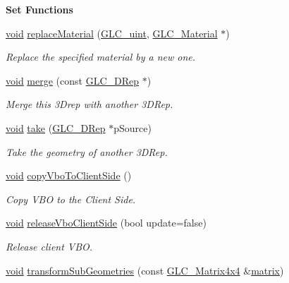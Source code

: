 \begin{Indent}{\bf Set Functions}
\begin{DoxyCompactItemize}
\hyperlink{group___u_a_v_objects_plugin_ga444cf2ff3f0ecbe028adce838d373f5c}{void} \hyperlink{class_g_l_c__3_d_rep_a1aa803da235b8c63f543c22ea040668e}{replace\-Material} (\hyperlink{glc__global_8h_abf950976fabed69026558df8e2da6c6b}{G\-L\-C\-\_\-uint}, \hyperlink{class_g_l_c___material}{G\-L\-C\-\_\-\-Material} $\ast$)
\begin{DoxyCompactList}\small\item\em Replace the specified material by a new one. \end{DoxyCompactList}\item 
\hyperlink{group___u_a_v_objects_plugin_ga444cf2ff3f0ecbe028adce838d373f5c}{void} \hyperlink{class_g_l_c__3_d_rep_a2a258fd51a958d88ed1bf466810d1aa9}{merge} (const \hyperlink{class_g_l_c__3_d_rep}{G\-L\-C\-\_\-D\-Rep} $\ast$)
\begin{DoxyCompactList}\small\item\em Merge this 3\-Drep with another 3\-D\-Rep. \end{DoxyCompactList}\item 
\hyperlink{group___u_a_v_objects_plugin_ga444cf2ff3f0ecbe028adce838d373f5c}{void} \hyperlink{class_g_l_c__3_d_rep_a3d39a18b5722448d651dfce9d6a22637}{take} (\hyperlink{class_g_l_c__3_d_rep}{G\-L\-C\-\_\-D\-Rep} $\ast$p\-Source)
\begin{DoxyCompactList}\small\item\em Take the geometry of another 3\-D\-Rep. \end{DoxyCompactList}\item 
\hyperlink{group___u_a_v_objects_plugin_ga444cf2ff3f0ecbe028adce838d373f5c}{void} \hyperlink{class_g_l_c__3_d_rep_ac1d9060716b6f262306f25f5a1903031}{copy\-Vbo\-To\-Client\-Side} ()
\begin{DoxyCompactList}\small\item\em Copy V\-B\-O to the Client Side. \end{DoxyCompactList}\item 
\hyperlink{group___u_a_v_objects_plugin_ga444cf2ff3f0ecbe028adce838d373f5c}{void} \hyperlink{class_g_l_c__3_d_rep_aa9c31bcbd1d790b4626e6a979cbda4f5}{release\-Vbo\-Client\-Side} (bool update=false)
\begin{DoxyCompactList}\small\item\em Release client V\-B\-O. \end{DoxyCompactList}\item 
\hyperlink{group___u_a_v_objects_plugin_ga444cf2ff3f0ecbe028adce838d373f5c}{void} \hyperlink{class_g_l_c__3_d_rep_a4d7fb925e83e1e71e1911590839a3d8e}{transform\-Sub\-Geometries} (const \hyperlink{class_g_l_c___matrix4x4}{G\-L\-C\-\_\-\-Matrix4x4} \&\hyperlink{glext_8h_a7b24a3f2f56eb1244ae69dacb4fecb6f}{matrix})

\end{DoxyCompactItemize}
\end{Indent}
